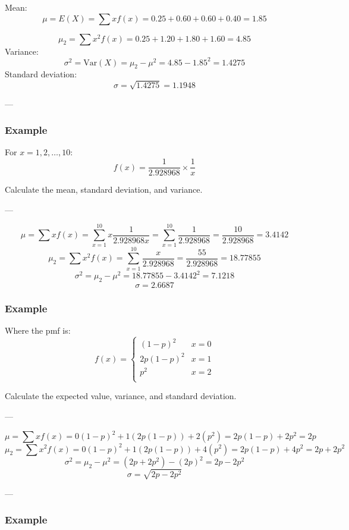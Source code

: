 \documentclass{article}
\begin{document}
Mean: $$\mu = E(X) = \sum x f(x) = 0.25 + 0.60 + 0.60  + 0.40 = \boxed{1.85}$$

$$\mu_2 = \sum x^2 f(x) = 0.25 + 1.20 + 1.80 + 1.60 = 4.85 $$
Variance: $$\sigma^2 = \text{Var}(X) = \mu_2 - \mu^2 = 4.85 - 1.85^2 = \boxed{1.4275}$$
Standard deviation: $$ \sigma = \sqrt{ 1.4275 } = \boxed{1.1948}$$

---

\subsubsection*{Example}

For $x = 1,2, \dots, 10$: $$f(x) = \frac{1}{2.928968} \times  \frac{1}{x}$$ 

Calculate the mean, standard deviation, and variance. 

---

$$\mu = \sum x f(x) = \sum_{x=1}^{10} x \frac{1}{2.928968x} = \sum_{x=1}^{10} \frac{1}{2.928968}  =\frac{10}{2.928968} = \boxed{3.4142}$$
$$\mu_2 = \sum x^2 f(x) = \sum_{x=1}^{10} \frac{x}{2.928968}  =\frac{55}{2.928968} = \boxed{18.77855}$$
$$\sigma^2 = \mu_2 - \mu^2 = 18.77855 - 3.4142^2 = \boxed{7.1218}$$
$$\sigma =  \boxed{2.6687}$$

\subsubsection*{Example}

Where the pmf is: $$f(x) = \begin{cases}
(1-p)^2 & x=0 \\
2p(1-p)^2 & x=1 \\
p^2 & x=2 \\
\end{cases}$$

Calculate the expected value, variance, and standard deviation. 

---

$$\mu = \sum xf(x) = 0(1-p)^2 + 1(2p(1-p)) + 2(p^2) = 2p(1-p) + 2p^2 = \boxed{2p}$$
$$\mu_2 = \sum x^2 f(x) = 0(1-p)^2 + 1(2p(1-p)) + 4(p^2) = 2p(1-p) + 4p^2 = 2p + 2p^2$$
$$\sigma^2 = \mu_2 - \mu^2 = (2p+2p^2) - (2p)^2 = \boxed{2p -2p^2}$$
$$\sigma =  \boxed{\sqrt{2p -2p^2}}$$

--- 

\subsubsection*{Example}
\end{document}
